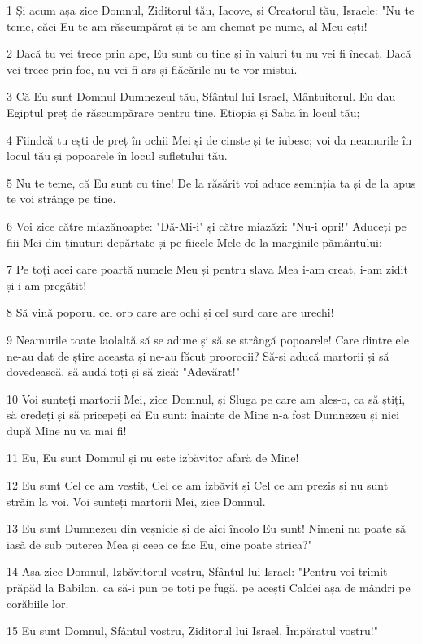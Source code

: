 \par 1 Și acum așa zice Domnul, Ziditorul tău, Iacove, și Creatorul tău, Israele: "Nu te teme, căci Eu te-am răscumpărat și te-am chemat pe nume, al Meu ești!
\par 2 Dacă tu vei trece prin ape, Eu sunt cu tine și în valuri tu nu vei fi înecat. Dacă vei trece prin foc, nu vei fi ars și flăcările nu te vor mistui.
\par 3 Că Eu sunt Domnul Dumnezeul tău, Sfântul lui Israel, Mântuitorul. Eu dau Egiptul preț de răscumpărare pentru tine, Etiopia și Saba în locul tău;
\par 4 Fiindcă tu ești de preț în ochii Mei și de cinste și te iubesc; voi da neamurile în locul tău și popoarele în locul sufletului tău.
\par 5 Nu te teme, că Eu sunt cu tine! De la răsărit voi aduce seminția ta și de la apus te voi strânge pe tine.
\par 6 Voi zice către miazănoapte: "Dă-Mi-i" și către miazăzi: "Nu-i opri!" Aduceți pe fiii Mei din ținuturi depărtate și pe fiicele Mele de la marginile pământului;
\par 7 Pe toți acei care poartă numele Meu și pentru slava Mea i-am creat, i-am zidit și i-am pregătit!
\par 8 Să vină poporul cel orb care are ochi și cel surd care are urechi!
\par 9 Neamurile toate laolaltă să se adune și să se strângă popoarele! Care dintre ele ne-au dat de știre aceasta și ne-au făcut proorocii? Să-și aducă martorii și să dovedească, să audă toți și să zică: "Adevărat!"
\par 10 Voi sunteți martorii Mei, zice Domnul, și Sluga pe care am ales-o, ca să știți, să credeți și să pricepeți că Eu sunt: înainte de Mine n-a fost Dumnezeu și nici după Mine nu va mai fi!
\par 11 Eu, Eu sunt Domnul și nu este izbăvitor afară de Mine!
\par 12 Eu sunt Cel ce am vestit, Cel ce am izbăvit și Cel ce am prezis și nu sunt străin la voi. Voi sunteți martorii Mei, zice Domnul.
\par 13 Eu sunt Dumnezeu din veșnicie și de aici încolo Eu sunt! Nimeni nu poate să iasă de sub puterea Mea și ceea ce fac Eu, cine poate strica?"
\par 14 Așa zice Domnul, Izbăvitorul vostru, Sfântul lui Israel: "Pentru voi trimit prăpăd la Babilon, ca să-i pun pe toți pe fugă, pe acești Caldei așa de mândri pe corăbiile lor.
\par 15 Eu sunt Domnul, Sfântul vostru, Ziditorul lui Israel, Împăratul vostru!"
